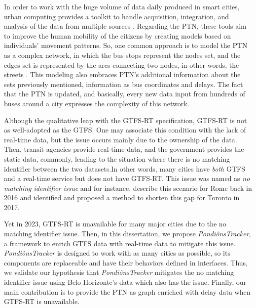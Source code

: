 In order to work with the huge volume of data daily produced in smart cities, 
urban computing provides a toolkit to handle acquisition, integration, and 
analysis of the data from multiple sources \cite{urban_computing}.
Regarding the PTN, these tools aim to improve the human mobility
of the citizens by creating models based on individuals' movement patterns.
So, one common approach is to model the PTN as a complex network, in which 
the bus stops represent the nodes set, and the edges set is represented 
by the arcs connecting two nodes, in other words, the streets \cite{ferber2012}. 
This modeling also embraces PTN's additional information about the
sets previously mentioned, information as bus coordinates and delays.
The fact that the PTN is updated, and basically, every new data input
from hundreds of buses around a city
expresses the complexity of this network.

Although the qualitative leap with the GTFS-RT specification, GTFS-RT
is not as well-adopted as the GTFS. One may associate this condition with
the lack of real-time data, but the issue occurs mainly due to the ownership of the data.
Then, transit agencies provide real-time data, and the government provides the static data, commonly, 
leading to the situation where there is no matching identifier 
between the two datasets.In other words, many cities have {\em both} GTFS and a real-time service 
but does not have GTFS-RT. This issue was named as {\em no matching identifier issue} and
for instance, 
 describe this scenario for Rome back in 2016
and  identified and proposed a method to 
shorten this gap for Toronto in 2017. 

Yet in 2023,
GTFS-RT is unavailable for many major cities due 
to the no matching identifier issue. Then,
in this dissertation, we propose \textit{PondiônsTracker}, a framework
to enrich GTFS data with real-time data to mitigate this issue. 
\textit{PondiônsTracker} is designed to work with as many cities as possible, so its components
are replaceable and have their behaviors defined in interfaces. Thus, we validate our hypothesis that
\textit{PondiônsTracker} mitigates the no matching identifier issue using Belo Horizonte's
data which also has the issue. Finally, our main contribution is to provide the PTN as graph enriched with delay data when GTFS-RT is unavailable.




